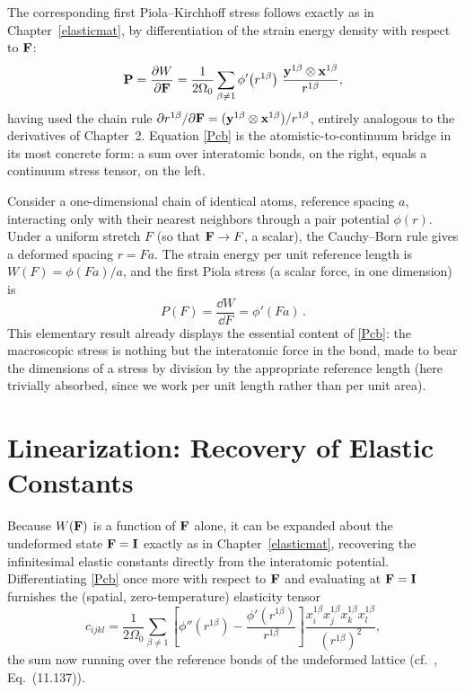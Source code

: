 The corresponding first Piola--Kirchhoff stress follows exactly as in Chapter~\ref{elasticmat}, by differentiation of the strain energy density with respect to $\mathbf{F}$:
\begin{equation}\label{Pcb}
	\mathbf{P} = \frac{\partial W}{\partial \mathbf{F}}
	= \frac{1}{2\Omega_0}\sum_{\beta\neq1} \phi'\!\left(r^{1\beta}\right)\, \frac{\mathbf{y}^{1\beta}\otimes\mathbf{x}^{1\beta}}{r^{1\beta}},
\end{equation}
having used the chain rule $\partial r^{1\beta}/\partial\mathbf{F} = (\mathbf{y}^{1\beta}\otimes\mathbf{x}^{1\beta})/r^{1\beta}$, entirely analogous to the derivatives of Chapter~2. Equation \eqref{Pcb} is the atomistic-to-continuum bridge in its most concrete form: a sum over interatomic bonds, on the right, equals a continuum stress tensor, on the left.

\begin{example}\label{ex:1Dchain}
	Consider a one-dimensional chain of identical atoms, reference spacing $a$, interacting only with their nearest neighbors through a pair potential $\phi(r)$. Under a uniform stretch $F$ (so that $\mathbf{F}\to F$, a scalar), the Cauchy--Born rule gives a deformed spacing $r = Fa$. The strain energy per unit reference length is $W(F) = \phi(Fa)/a$, and the first Piola stress (a scalar force, in one dimension) is
	\begin{equation}
		P(F) = \frac{\dd W}{\dd F} = \phi'(Fa)\,.
	\end{equation}
	This elementary result already displays the essential content of \eqref{Pcb}: the macroscopic stress is nothing but the interatomic force in the bond, made to bear the dimensions of a stress by division by the appropriate reference length (here trivially absorbed, since we work per unit length rather than per unit area).
\end{example}

\section{Linearization: Recovery of Elastic Constants}

Because $W(\mathbf{F})$ is a function of $\mathbf{F}$ alone, it can be expanded about the undeformed state $\mathbf{F}=\mathbf{I}$ exactly as in Chapter~\ref{elasticmat}, recovering the infinitesimal elastic constants directly from the interatomic potential. Differentiating \eqref{Pcb} once more with respect to $\mathbf{F}$ and evaluating at $\mathbf{F}=\mathbf{I}$ furnishes the (spatial, zero-temperature) elasticity tensor
\begin{equation}\label{ccb}
	c_{ijkl} = \frac{1}{2\Omega_0}\sum_{\beta\neq1}\left[\phi''(r^{1\beta}) - \frac{\phi'(r^{1\beta})}{r^{1\beta}}\right]\frac{x_i^{1\beta}x_j^{1\beta}x_k^{1\beta}x_l^{1\beta}}{\left(r^{1\beta}\right)^2},
\end{equation}
the sum now running over the reference bonds of the undeformed lattice (cf.\ \cite{TadmorMiller}, Eq.~(11.137)).

